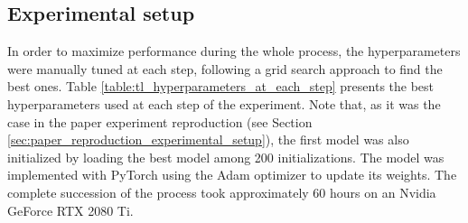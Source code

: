 \subsection{Experimental setup}
\setlength{\marginparwidth}{3cm}\leavevmode {}%
In order to maximize performance during the whole process, the hyperparameters were manually tuned at each step, following a grid search approach to find the best ones. Table \ref{table:tl_hyperparameters_at_each_step} presents the best hyperparameters used at each step of the experiment. Note that, as it was the case in the paper experiment reproduction (see Section \ref{sec:paper_reproduction_experimental_setup}), the first model was also initialized by loading the best model among 200 initializations. The model was implemented with PyTorch using the Adam optimizer to update its weights. The complete succession of the process took approximately 60 hours on an Nvidia GeForce RTX 2080 Ti. 


